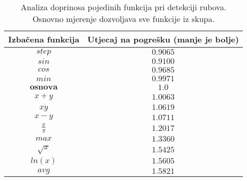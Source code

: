 \begin{table}
	\centering
	\begin{tabular}{||c c||}
		\hline
		Izbačena funkcija & Utjecaj na pogrešku (manje je bolje)\\ [0.5ex]
		\hline \hline
		$step$ & $0.9065$\\
		$sin$ & $0.9100$\\
		$cos$ & $0.9685$\\
		$min$ & $0.9971$\\
		$\bm{osnova}$ & $\bm{1.0}$\\
		$x + y$ & $1.0063$\\
		$x \dot y$ & $1.0619$\\
		$x - y$ & $1.0711$\\
		$\frac{x}{y}$ & $1.2017$\\
		$max$ & $1.3360$\\
		$\sqrt{x}$ & $1.5425$\\
		$ln(x)$ & $1.5605$\\
		$avg$ & $1.5821$\\ [1ex]
		\hline
	\end{tabular}
	\caption{Analiza doprinosa pojedinih funkcija pri detekciji rubova. Osnovno mjerenje dozvoljava sve funkcije iz skupa.}
	\label{table:edge_detection_function_quality}
\end{table}
